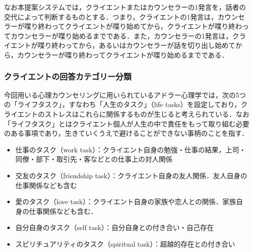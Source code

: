 \documentclass[shuuron]{kuee}
\begin{document}



なお本提案システムでは，クライエントまたはカウンセラーの1発言を，話者の交代によって判断するものとする．つまり，クライエントの1発言は，カウンセラーが喋り終わってクライエントが喋り始めてから，クライエントが喋り終わってカウンセラーが喋り始めるまでである．また，カウンセラーの1発言は，クライエントが喋り終わってから，あるいはカウンセラーが話を切り出し始めてから，カウンセラーが喋り終わってクライエントが喋り始めるまでである．

\subsubsection{クライエントの回答カテゴリー分類}


今回用いる心理カウンセリングに用いられているアドラー心理学では，次の5つの「ライフタスク」，すなわち「人生のタスク」（life tasks）を設定しており，クライエントのストレスはこれらに関係するものが生じると考えられている．なお「ライフタスク」とはクライエント個人が人生の中で責任をもって取り組む必要のある事項であり，生きていくうえで避けることができない事柄のことを指す．
\begin{itemize}
  \item 仕事のタスク（work task）：クライエント自身の勉強・仕事の結果，上司・同僚・部下・取引先・客などとの仕事上の対人関係
  \item 交友のタスク（friendship task）：クライエント自身の友人関係．友人自身の仕事関係なども含む
  \item 愛のタスク（love task）：クライエント自身の家族や恋人との関係．家族自身の仕事関係なども含む．
  \item 自分自身のタスク（self task）：自分自身との付き合い・自己存在
  \item スピリチュアリティのタスク（spiritual task）：超越的存在との付き合い\cite{大友秀治2013全人的人間理解を促進するスピリチュアリティ概念に関する一考察}
\end{itemize}
\end{document}
